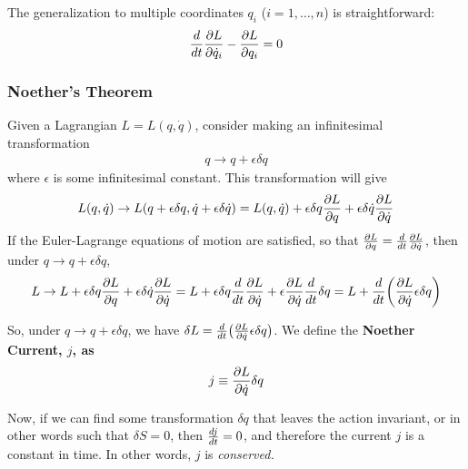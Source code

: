 \documentclass[12pt,epsf]{article}
\def\nolabel{\nonumber }
\def\nolabel{\nonumber }
\begin{document}
The generalization to multiple coordinates $q_i$ ($i=1,\ldots,n$) is
straightforward:
\begin{eqnarray}
{d \over dt} {\partial L \over \partial \dot{q}_i} - {\partial L \over
\partial q_i} = 0 \label{eq:eulerlagrange}
\end{eqnarray}

\subsubsection{Noether's Theorem}
\label{sec:noether}

Given a Lagrangian $L=L(q,\dot{q})$, consider making an infinitesimal
transformation
\begin{eqnarray}
q \rightarrow q+\epsilon \delta q \nolabel
\end{eqnarray}
where $\epsilon$ is some infinitesimal constant.  This transformation
will give 
\begin{eqnarray}
L(q,\dot{q}) \rightarrow L(q+\epsilon \delta q, \dot{q}+\epsilon \delta
\dot{q}) = L(q,\dot{q})+\epsilon \delta q{\partial L \over \partial
q}+\epsilon \delta \dot{q} {\partial L \over \partial \dot{q}} \nolabel 
\end{eqnarray}
If the Euler-Lagrange equations of motion are satisfied, so that
${\partial L \over \partial q} = {d \over dt} {\partial L \over
\partial \dot{q}}$, then under $q \rightarrow q + \epsilon \delta q$, 
\begin{eqnarray}
L \rightarrow L + \epsilon \delta q {\partial L \over \partial q} +
\epsilon \delta \dot{q} {\partial L \over \partial \dot{q}} = L +
\epsilon \delta q {d \over dt} {\partial L \over \partial \dot{q}} +
\epsilon {\partial L \over \partial \dot{q}}{d \over dt} \delta q  = L
+ {d \over dt} \bigg({\partial L \over \partial \dot{q}} \epsilon
\delta q\bigg) \nolabel 
\end{eqnarray}

So, under $q \rightarrow q+ \epsilon \delta q$, we have $\delta L = {d
\over dt} \big({\partial L \over \partial \dot{q}} \epsilon \delta q
\big)$.  We define the \bf Noether Current\rm, $j$, as 
\begin{eqnarray}
j \equiv {\partial L \over \partial \dot{q}} \delta q \nolabel 
\end{eqnarray}

Now, if we can find some transformation $\delta q$ that leaves the
action invariant, or in other words such that $\delta S = 0$, then ${d
j \over dt} = 0$, and therefore the current $j$ is a constant in time. 
In other words, $j$ is \it conserved\rm.  
\end{document}
